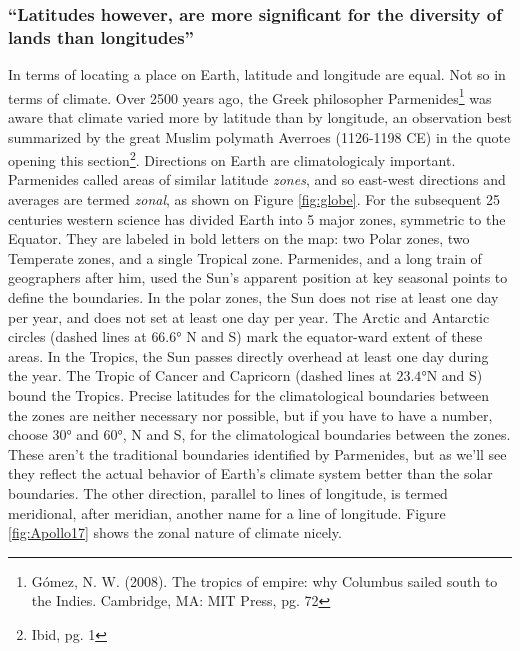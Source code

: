 \subsubsection{``Latitudes however, are more significant for the diversity of lands than longitudes''}
In terms of locating a place on Earth, latitude and longitude are equal. Not so in terms of climate. Over 2500 years ago, the Greek philosopher Parmenides\footnote{G\'{o}mez, N. W. (2008). The tropics of empire: why Columbus sailed south to the Indies. Cambridge, MA: MIT Press, pg. 72} was aware that climate varied more by latitude than by longitude, an observation best summarized by the great Muslim polymath Averro{\:e}s (1126-1198 CE) in the quote opening this section\footnote{Ibid, pg. 1}. Directions on Earth are climatologicaly important.\\
Parmenides called areas of similar latitude \emph{zones}, and so east-west directions and averages are termed \emph{zonal}, as shown on Figure \ref{fig:globe}. For the subsequent 25 centuries western science has divided Earth into 5 major zones, symmetric to the Equator. They are labeled in bold letters on the map: two Polar zones, two Temperate zones, and a single Tropical zone. Parmenides, and a long train of geographers after him, used the Sun's apparent position at key seasonal points to define the boundaries. In the polar zones, the Sun does not rise at least one day per year, and does not set at least one day per year. The Arctic and Antarctic circles (dashed lines at $\ang{66.6}$ N and S) mark the equator-ward extent of these areas. In the Tropics, the Sun passes directly overhead at least one day during the year. The Tropic of Cancer and Capricorn (dashed lines at $\ang{23.4}$N and S) bound the Tropics. Precise latitudes for the climatological boundaries between the zones are neither necessary nor possible, but if you have to have a number, choose $\ang{30}$ and $\ang{60}$, N and S, for the climatological boundaries between the zones. These aren't the traditional boundaries identified by Parmenides, but as we'll see they reflect the actual behavior of Earth's climate system better than the solar boundaries. The other direction, parallel to lines of longitude, is termed meridional, after meridian, another name for a line of longitude. Figure \ref{fig:Apollo17} shows the zonal nature of climate nicely. \\
